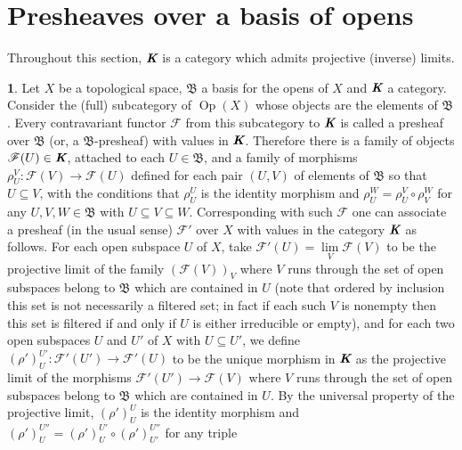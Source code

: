 \documentclass[12pt]{amsart}
\newcommand{\ou}{\operatorname{Op}}
\theoremstyle{definition}
\newtheorem{bk}[proposition]{}
\begin{document}
\section{Presheaves over a basis of opens}

Throughout this section, $\emph{\textbf{K}}$ is a category which admits  projective (inverse) limits.


\begin{bk}\label{I: 3.2.1} Let $X$ be a topological space, $\mathfrak{B}$ a basis for the opens of $X$ and $\emph{\textbf{K}}$ a category. Consider the (full) subcategory of $\ou(X)$ whose objects are the elements of $\mathfrak{B}$. Every contravariant functor $\mathscr{F}$ from this subcategory to $\emph{\textbf{K}}$ is called a presheaf over $\mathfrak{B}$ (or, a $\mathfrak{B}$-presheaf) with values in $\emph{\textbf{K}}$. Therefore there is a family of objects $\mathscr{F}(U)\in\emph{\textbf{K}}$, attached to each $U\in\mathfrak{B}$, and a family of morphisms $\rho_{U}^{V}:\mathscr{F}(V)\rightarrow\mathscr{F}(U)$ defined for each pair $(U,V)$ of elements of $\mathfrak{B}$ so that $U\subseteq V$, with the conditions that $\rho_{U}^{U}$ is the identity morphism and $\rho_{U}^{W}=\rho_{U}^{V}\circ\rho_{V}^{W}$ for any $U,V,W\in\mathfrak{B}$ with $U\subseteq V\subseteq W$.
Corresponding with such $\mathscr{F}$ one can associate a presheaf (in the usual sense) $\mathscr{F}'$ over $X$ with values in the category $\emph{\textbf{K}}$ as follows. For each open subspace $U$ of $X$, take $\mathscr{F}'(U)=\lim\limits_{V}\mathscr{F}(V)$ to be the projective limit of the family $(\mathscr{F}(V))_{V}$ where $V$ runs through the set of open subspaces belong to $\mathfrak{B}$ which are contained in $U$ (note that ordered by inclusion this set is not necessarily a filtered set; in fact if each such $V$ is nonempty then this set is filtered if and only if $U$ is either irreducible or empty), and for each two open subspaces $U$ and $U'$ of $X$ with $U\subseteq U'$, we define $(\rho')_{U}^{U'}:\mathscr{F}'(U')\rightarrow\mathscr{F}'(U)$ to be the unique morphism in $\emph{\textbf{K}}$ as the projective limit of the morphisms $\mathscr{F}'(U')\rightarrow\mathscr{F}(V)$ where $V$ runs through the set of open subspaces belong to $\mathfrak{B}$ which are contained in $U$. By the universal property of the projective limit, $(\rho')_{U}^{U}$ is the identity morphism and $(\rho')_{U}^{U''}=(\rho')_{U}^{U'}\circ(\rho')_{U'}^{U''}$ for any triple

\end{bk}
\end{document}
